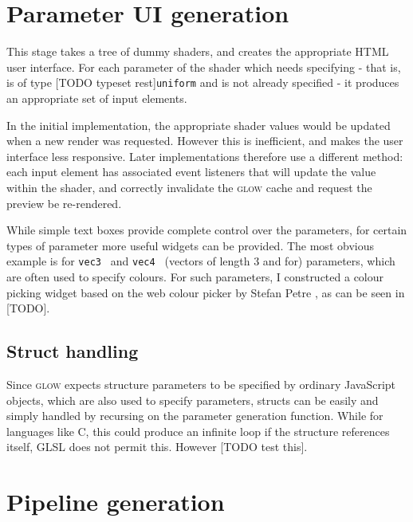 \documentclass[12pt,twoside,notitlepage]{report}
\begin{document}
\section{Parameter UI generation}
\label{ui-params}
This stage takes a tree of dummy shaders, and creates the appropriate HTML user interface. For each parameter of the shader which needs specifying - that is, is of type [TODO typeset rest]{\tt uniform} and is not already specified - it produces an appropriate set of input elements. 

In the initial implementation, the appropriate shader values would be updated when a new render was requested. However this is inefficient, and makes the user interface less responsive. Later implementations therefore use a different method: each input element has associated event listeners that will update the value within the shader, and correctly invalidate the \textsc{glow} cache and request the preview be re-rendered.

While simple text boxes provide complete control over the parameters, for certain types of parameter more useful widgets can be provided. The most obvious example is for {\tt vec3 } and {\tt vec4 } (vectors of length 3 and for) parameters, which are often used to specify colours. For such parameters, I constructed a colour picking widget based on the web colour picker by Stefan Petre \cite{color}, as can be seen in [TODO].

\subsection{Struct handling}
Since \textsc{glow} expects structure parameters to be specified by ordinary JavaScript objects, which are also used to specify parameters, structs can be easily and simply handled by recursing on the parameter generation function. While for languages like C, this could produce an infinite loop if the structure references itself, GLSL does not permit this. However [TODO test this].

\section{Pipeline generation}
\end{document}
